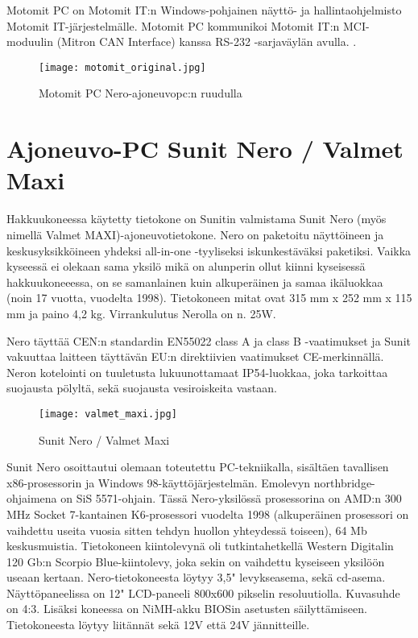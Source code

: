 Motomit PC on Motomit IT:n Windows-pohjainen näyttö- ja hallintaohjelmisto Motomit IT-järjestelmälle. Motomit PC kommunikoi Motomit IT:n MCI-moduulin (Mitron CAN Interface) kanssa RS-232 -sarjaväylän avulla.
 \cite{motomit:esite}.
\newline
\begin{figure}[H]
\centering
\texttt{[image: motomit\_original.jpg]}
\caption{Motomit PC Nero-ajoneuvopc:n ruudulla}
\end{figure}

\section{Ajoneuvo-PC Sunit Nero / Valmet Maxi}

Hakkuukoneessa käytetty tietokone on Sunitin valmistama Sunit Nero (myös nimellä Valmet MAXI)-ajoneuvotietokone. Nero on paketoitu näyttöineen ja keskusyksikköineen yhdeksi all-in-one -tyyliseksi iskunkestäväksi paketiksi. Vaikka kyseessä ei olekaan sama yksilö mikä on alunperin ollut kiinni kyseisessä hakkuukoneeessa, on se samanlainen kuin alkuperäinen ja samaa ikäluokkaa (noin 17 vuotta, vuodelta 1998). Tietokoneen mitat ovat 315 mm x 252 mm x 115 mm ja paino 4,2 kg. Virrankulutus Nerolla on n. 25W.

Nero täyttää CEN:n standardin EN55022 class A ja class B -vaatimukset ja Sunit vakuuttaa laitteen täyttävän EU:n direktiivien vaatimukset CE-merkinnällä. Neron kotelointi on tuuletusta lukuunottamaat IP54-luokkaa, joka tarkoittaa suojausta pölyltä, sekä suojausta vesiroiskeita vastaan. \cite{nero:manual}

\begin{figure}[H]
\centering
\texttt{[image: valmet\_maxi.jpg]}
\caption{Sunit Nero / Valmet Maxi}
\end{figure}

Sunit Nero osoittautui olemaan toteutettu PC-tekniikalla, sisältäen tavallisen x86-prosessorin ja Windows 98-käyttöjärjestelmän. Emolevyn northbridge-ohjaimena on SiS 5571-ohjain. Tässä Nero-yksilössä prosessorina on AMD:n 300 MHz Socket 7-kantainen K6-prosessori vuodelta 1998 (alkuperäinen prosessori on vaihdettu useita vuosia sitten tehdyn huollon yhteydessä toiseen), 64 Mb keskusmuistia. Tietokoneen kiintolevynä oli tutkintahetkellä Western Digitalin 120 Gb:n Scorpio Blue-kiintolevy, joka sekin on vaihdettu kyseiseen yksilöön useaan kertaan. Nero-tietokoneesta löytyy 3,5" levykseasema, sekä cd-asema. Näyttöpaneelissa on 12" LCD-paneeli 800x600 pikselin resoluutiolla. Kuvasuhde on 4:3. Lisäksi koneessa on NiMH-akku BIOSin asetusten säilyttämiseen. Tietokoneesta löytyy liitännät sekä 12V että 24V jännitteille.
\newline\newline

